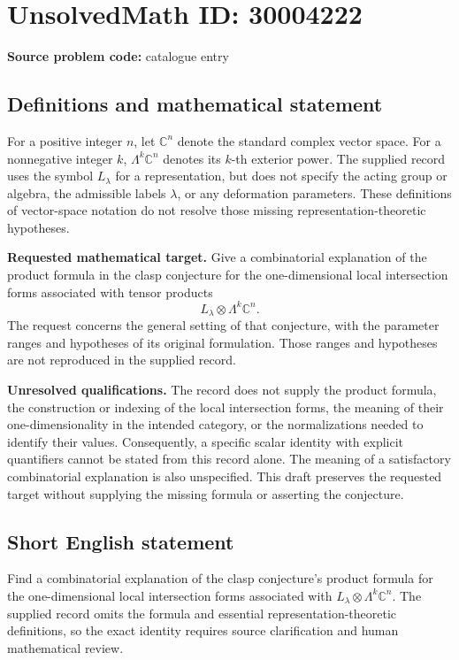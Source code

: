 \documentclass[11pt]{article}
\newcommand{\C}{\mathbb{C}}
\begin{document}
\section*{UnsolvedMath ID: 30004222}
\textbf{Source problem code:} catalogue entry
\subsection{Definitions and mathematical statement}
For a positive integer \(n\), let \(\C^n\) denote the standard complex vector space. For a nonnegative integer \(k\), \(\Lambda^k\C^n\) denotes its \(k\)-th exterior power. The supplied record uses the symbol \(L_\lambda\) for a representation, but does not specify the acting group or algebra, the admissible labels \(\lambda\), or any deformation parameters. These definitions of vector-space notation do not resolve those missing representation-theoretic hypotheses.

\textbf{Requested mathematical target.} Give a combinatorial explanation of the product formula in the clasp conjecture for the one-dimensional local intersection forms associated with tensor products
\[
L_\lambda\otimes\Lambda^k\C^n.
\]
The request concerns the general setting of that conjecture, with the parameter ranges and hypotheses of its original formulation. Those ranges and hypotheses are not reproduced in the supplied record.

\textbf{Unresolved qualifications.} The record does not supply the product formula, the construction or indexing of the local intersection forms, the meaning of their one-dimensionality in the intended category, or the normalizations needed to identify their values. Consequently, a specific scalar identity with explicit quantifiers cannot be stated from this record alone. The meaning of a satisfactory combinatorial explanation is also unspecified. This draft preserves the requested target without supplying the missing formula or asserting the conjecture.
\subsection{Short English statement}
Find a combinatorial explanation of the clasp conjecture's product formula for the one-dimensional local intersection forms associated with \(L_\lambda\otimes\Lambda^k\C^n\). The supplied record omits the formula and essential representation-theoretic definitions, so the exact identity requires source clarification and human mathematical review.
\end{document}
